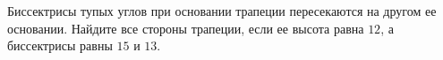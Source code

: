\begin{ex}
	\begin{condition}
		Биссектрисы тупых углов при основании трапеции пересекаются на другом ее основании. Найдите все стороны трапеции, если ее высота равна \( 12 \), а биссектрисы равны \( 15  \) и \( 13 \).
	\end{condition}
\end{ex}